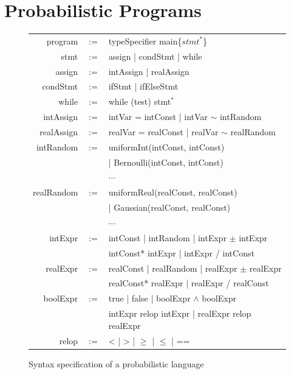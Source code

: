 \documentclass[sigconf,review, anonymous]{acmart}
\begin{document}
\section{Probabilistic Programs}
\begin{figure}[ht]
	\centering
	\begin{tabular}{rcl}
		\hline
		program & $:=$ & typeSpecifier main\{$stmt^*$\} \\
		stmt & $:=$ & assign | condStmt | while \\
		assign & $:=$ & intAssign | realAssign \\
		condStmt & $:=$ & ifStmt | ifElseStmt\\
		while & $:=$ & while (test) stmt$^*$\\
		intAssign & $:=$ &  intVar = intConst | intVar $\sim$ intRandom\\
		realAssign & $:=$ & realVar = realConst | realVar $\sim$ realRandom\\
		intRandom & $:=$ & uniformInt(intConst, intConst)\\
		&  & | Bernoulli(intConst, intConst)\\
		&  & $\cdots$ \\
		realRandom & $:=$ & uniformReal(realConst, realConst)\\
		&  & | Gaussian(realConst, realConst)\\
		&  & $\cdots$ \\
		intExpr & $:=$ & intConst | intRandom | intExpr $\pm$ intExpr\\
		& & intConst* intExpr | intExpr / intConst\\
		realExpr & $:=$ & realConst | realRandom | realExpr $\pm$ realExpr\\
		& & realConst* realExpr | realExpr / realConst\\
		boolExpr& $:=$ & true | false | boolExpr $\wedge$ boolExpr \\
		& & intExpr relop intExpr | realExpr relop realExpr\\
		relop & $:=$ & <  |  > | $\geq$ | $\leq$ | ==\\
		\hline
	\end{tabular}
	\caption{Syntax specification of a probabilistic language}	\label{syntax}
\end{figure}
\end{document}
